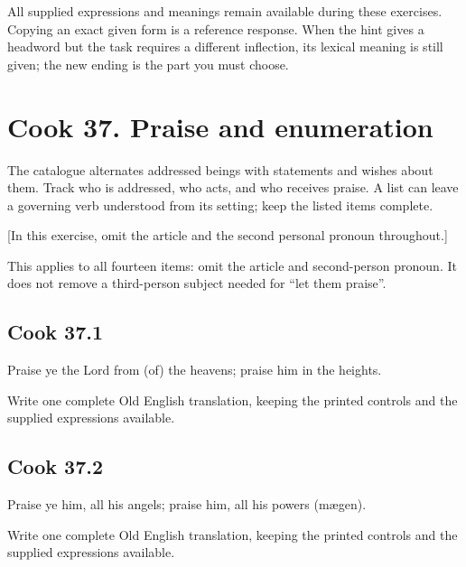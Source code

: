 All supplied expressions and meanings remain available during these exercises. Copying an exact given form is a reference response. When the hint gives a headword but the task requires a different inflection, its lexical meaning is still given; the new ending is the part you must choose.

\section*{Cook 37. Praise and enumeration}

The catalogue alternates addressed beings with statements and wishes about them. Track who is addressed, who acts, and who receives praise. A list can leave a governing verb understood from its setting; keep the listed items complete.

[In this exercise, omit the article and the second personal pronoun throughout.]

This applies to all fourteen items: omit the article and second-person pronoun. It does not remove a third-person subject needed for “let them praise”.

\par\begin{minipage}{\linewidth}\raggedright
\subsection*{Cook 37.1}

Praise ye the Lord from (of) the heavens; praise him in the heights.

Write one complete Old English translation, keeping the printed controls and the supplied expressions available.

\end{minipage}\par\addvspace{4pt}

\par\begin{minipage}{\linewidth}\raggedright
\subsection*{Cook 37.2}

Praise ye him, all his angels; praise him, all his powers (mægen).

Write one complete Old English translation, keeping the printed controls and the supplied expressions available.

\end{minipage}\par\addvspace{4pt}

